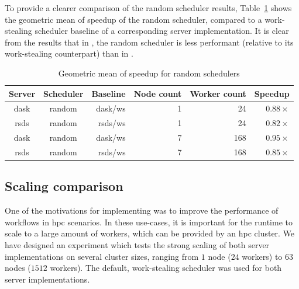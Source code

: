 To provide a clearer comparison of the random scheduler results, Table~\ref{tab:rsds-random-geom-mean-speedup}
shows the geometric mean of speedup of the random scheduler, compared to a work-stealing scheduler
baseline of a corresponding server implementation. It is clear from the results that in
\rsds{}, the random scheduler is less performant (relative to its work-stealing
counterpart) than in \dask{}.

\setlength{\tabcolsep}{5pt}
\begin{table}
	\centering
	\begin{tabular}{c|c|r|r|r|r}
		\textbf{Server}      & \textbf{Scheduler} & \textbf{Baseline} & \textbf{Node count} &
		\textbf{Worker	count} & \textbf{Speedup}                                                   \\
		\midrule
		dask                 & random             & dask/ws           & 1                   & 24
		                     & $0.88\times$                                                       \\
		rsds                 & random             & rsds/ws           & 1                   & 24
		                     & $0.82\times$                                                       \\
		dask                 & random             & dask/ws           & 7                   & 168
		                     & $0.95\times$                                                       \\
		rsds                 & random             & rsds/ws           & 7                   & 168
		                     & $0.85\times$                                                       \\
	\end{tabular}
	\caption{Geometric mean of speedup for random schedulers}
	\label{tab:rsds-random-geom-mean-speedup}
\end{table}

\subsection*{Scaling comparison}
One of the motivations for implementing \rsds{} was to improve the performance
of \dask{} workflows in \gls{hpc} scenarios. In these
use-cases, it is important for the runtime to scale to a large amount of workers, which can be
provided by an \gls{hpc} cluster. We have designed an experiment which tests the
strong scaling of both server implementations on several cluster sizes, ranging from
$1$ node ($24$ workers) to $63$
nodes ($1512$ workers). The default, work-stealing scheduler was used for both
server implementations.

